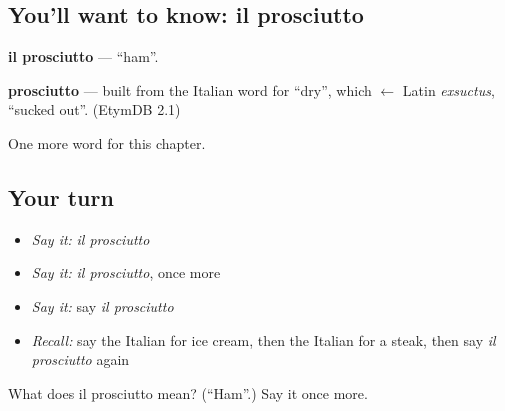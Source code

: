 \subsection*{You'll want to know: il prosciutto}
\textbf{il prosciutto} — \textquotedblleft{}ham\textquotedblright{}.

\begin{cousinweb}
\textbf{prosciutto} — built from the Italian word for \textquotedblleft{}dry\textquotedblright{}, which $\leftarrow$ Latin \emph{exsuctus}, \textquotedblleft{}sucked out\textquotedblright{}. (EtymDB 2.1)
\end{cousinweb}

\begin{grammarlens}[title={What you've built}]
One more word for this chapter.
\end{grammarlens}

\subsection*{Your turn}
\begin{itemize}
\raggedright
  \item \emph{Say it:} \emph{il prosciutto}
  \item \emph{Say it:} \emph{il prosciutto}, once more
  \item \emph{Say it:} say \emph{il prosciutto}
  \item \emph{Recall:} say the Italian for ice cream, then the Italian for a steak, then say \emph{il prosciutto} again
\end{itemize}

\begin{tcolorbox}[breakable,colback=teal!4,colframe=teal!35!black,title={Before you move on}]
What does il prosciutto mean? (\textquotedblleft{}Ham\textquotedblright{}.) Say it once more.
\end{tcolorbox}
